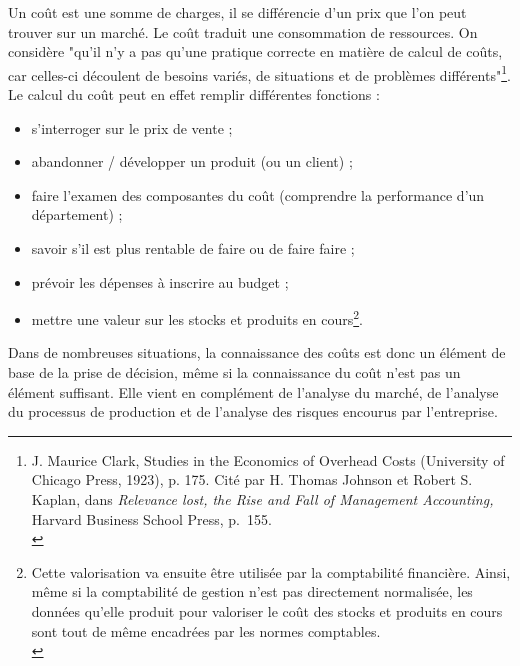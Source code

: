 \documentclass{tufte-handout}
\begin{document}
Un coût est une somme de charges, il se différencie d'un prix que l'on peut trouver sur un marché. Le coût traduit une consommation de ressources. On considère "qu'il n'y a pas qu'une pratique correcte en matière de calcul de coûts, car celles-ci découlent de besoins variés, de situations et de problèmes différents"\footnote{J. Maurice Clark, Studies in the Economics of Overhead Costs (University of Chicago Press, 1923), p. 175. Cité par H. Thomas Johnson et Robert S. Kaplan, dans \emph{Relevance lost, the Rise and Fall of Management Accounting,} Harvard Business School Press, p. 155.\\}. Le calcul du coût peut en effet remplir différentes fonctions :\\
\begin{itemize}
\item s’interroger sur le prix de vente ;\\
\item abandonner / développer un produit (ou un client) ;\\
\item faire l’examen des composantes du coût (comprendre la performance d’un département) ;\\
\item savoir s’il est plus rentable de faire ou de faire faire ;\\
\item prévoir les dépenses à inscrire au budget ;\\
\item mettre une valeur sur les stocks et produits en cours\footnote{Cette valorisation va ensuite être utilisée par la comptabilité financière. Ainsi, même si la comptabilité de gestion n'est pas directement normalisée, les données qu'elle produit pour valoriser le coût des stocks et produits en cours sont tout de même encadrées par les normes comptables.\\}.\\
\end{itemize}

Dans de nombreuses situations, la connaissance des coûts est donc un élément de base de la prise de décision, même si la connaissance du coût n'est pas un élément suffisant. Elle vient en complément de l'analyse du marché, de l'analyse du processus de production et de l'analyse des risques encourus par l'entreprise.\\
\end{document}
